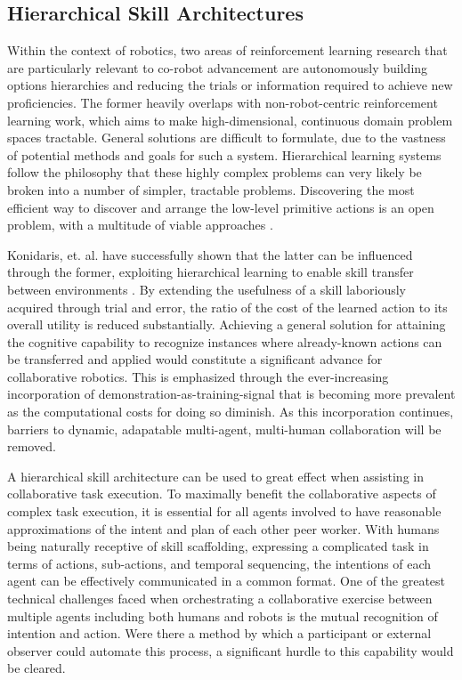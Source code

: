 \documentclass[letterpaper]{article}
\begin{document}
\subsection{Hierarchical Skill Architectures}
Within the context of robotics, two areas of reinforcement learning research that are particularly relevant to co-robot advancement are autonomously building options hierarchies and reducing the trials or information required to achieve new proficiencies. The former heavily overlaps with non-robot-centric reinforcement learning work, which aims to make high-dimensional, continuous domain problem spaces tractable. General solutions are difficult to formulate, due to the vastness of potential methods and goals for such a system. Hierarchical learning systems follow the philosophy that these highly complex problems can very likely be broken into a number of simpler, tractable problems. Discovering the most efficient way to discover and arrange the low-level primitive actions is an open problem, with a multitude of viable approaches \cite{EfficientSkillLearning,AutoHierarchyLearning,LearningHierarchicalControl}.

Konidaris, et. al. have successfully shown that the latter can be influenced through the former, exploiting hierarchical learning to enable skill transfer between environments \cite{AutoSkillAcquisition}. By extending the usefulness of a skill laboriously acquired through trial and error, the ratio of the cost of the learned action to its overall utility is reduced substantially. Achieving a general solution for attaining the cognitive capability to recognize instances where already-known actions can be transferred and applied would constitute a significant advance for collaborative robotics. This is emphasized through the ever-increasing incorporation of demonstration-as-training-signal that is becoming more prevalent as the computational costs for doing so diminish. As this incorporation continues, barriers to dynamic, adapatable multi-agent, multi-human collaboration will be removed. 
	
A hierarchical skill architecture can be used to great effect when assisting in collaborative task execution. To maximally benefit the collaborative aspects of complex task execution, it is essential for all agents involved to have reasonable approximations of the intent and plan of each other peer worker. With humans being naturally receptive of skill scaffolding, expressing a complicated task in terms of actions, sub-actions, and temporal sequencing, the intentions of each agent can be effectively communicated in a common format. One of the greatest technical challenges faced when orchestrating a collaborative exercise between multiple agents including both humans and robots is the mutual recognition of intention and action. Were there a method by which a participant or external observer could automate this process, a significant hurdle to this capability would be cleared.
 
\end{document}
